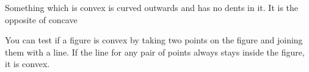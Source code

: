 Something which is convex is curved outwards and has no dents 
in it.
It is the opposite of concave
\par
You can test if a figure is convex by taking two points on the figure and joining them with a line.  
If the line for any pair of points always stays inside the figure,  it is convex.